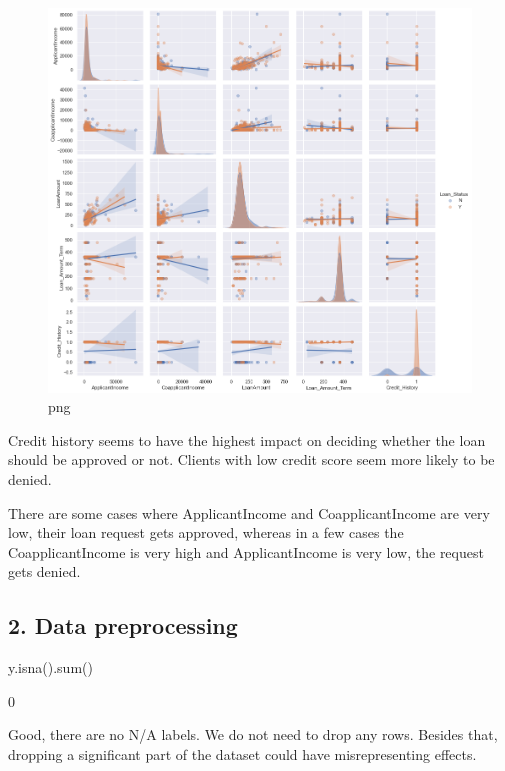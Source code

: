 \documentclass[]{article}
\newenvironment{Shaded}{}{}
\newcommand{\BuiltInTok}[1]{#1}
\newcommand{\NormalTok}[1]{#1}
\begin{document}
\begin{figure}
\centering
\includegraphics{notebook_files/notebook_24_2.png}
\caption{png}
\end{figure}

Credit history seems to have the highest impact on deciding whether the
loan should be approved or not. Clients with low credit score seem more
likely to be denied.

There are some cases where ApplicantIncome and CoapplicantIncome are
very low, their loan request gets approved, whereas in a few cases the
CoapplicantIncome is very high and ApplicantIncome is very low, the
request gets denied.

\hypertarget{data-preprocessing}{%
\subsection{2. Data preprocessing}\label{data-preprocessing}}

\begin{Shaded}
\begin{Highlighting}[]
\NormalTok{y.isna().}\BuiltInTok{sum}\NormalTok{()}
\end{Highlighting}
\end{Shaded}

0

Good, there are no N/A labels. We do not need to drop any rows. Besides
that, dropping a significant part of the dataset could have
misrepresenting effects.
\end{document}
